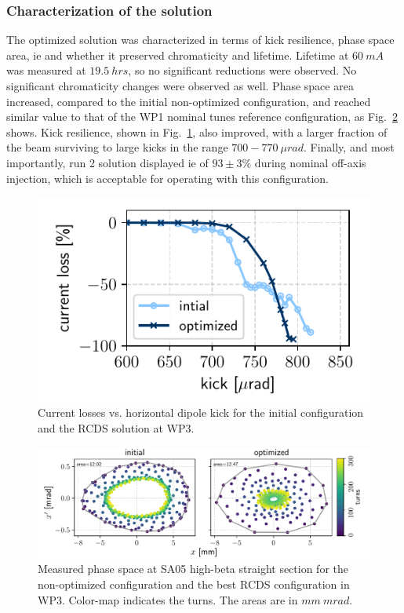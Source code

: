 \subsubsection{Characterization of the solution}
The optimized solution was characterized in terms of kick resilience, phase space area, \gls*{ie} and whether it preserved chromaticity and lifetime.  Lifetime at $60~\unit{mA}$ was measured at $19.5~\unit{hrs}$, so no significant reductions were observed. No significant chromaticity changes were observed as well. Phase space area increased, compared to the initial non-optimized configuration, and reached similar value to that of the WP1 nominal tunes reference configuration, as Fig.~\ref{fig:wp3_phase_space} shows. Kick resilience, shown in Fig.~\ref{fig:wp3_kick_res}, also improved, with a larger fraction of the beam surviving to large kicks in the range  $700-770~\unit{\mu rad}$. Finally, and most importantly, run 2 solution displayed \gls*{ie} of $93\pm3\%$ during nominal off-axis injection, which is acceptable for operating with this configuration.
\begin{figure}[tb]
    \centering
    \includegraphics[width=0.6\columnwidth]{Images/wp3_kick_resilience.pdf}
    \caption[Current losses vs. horizontal dipole kick for the initial configuration and the RCDS solution at WP3.]{Current losses vs. horizontal dipole kick for the initial configuration and the \gls*{RCDS} solution at \gls*{WP3}.}
    \label{fig:wp3_kick_res}
\end{figure}
\begin{figure}[htb]
    \centering
    \includegraphics[width=\textwidth]{Images/wp3_phase_space.pdf}
    \caption[Measured phase space at SA05 high-beta straight section for the non-optimized configuration and the best RCDS configuration in WP 3.]{Measured phase space at SA05 high-beta straight section for the non-optimized configuration and the best \gls*{RCDS} configuration in  \gls*{WP3}. Color-map indicates the turns. The areas are in $\unit{mm}~\unit{mrad}$.}
    \label{fig:wp3_phase_space}

\end{figure}
